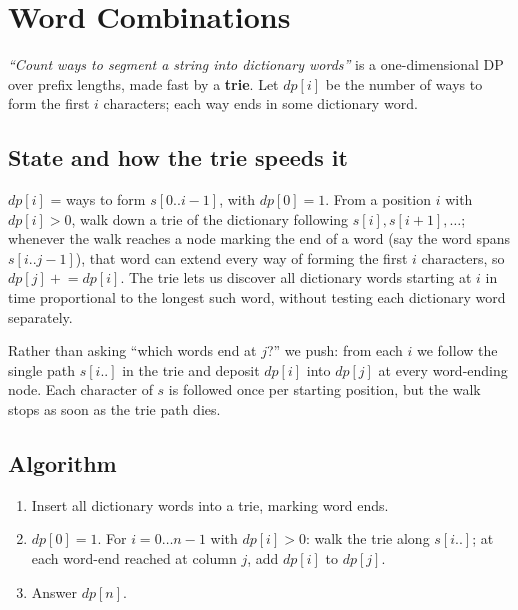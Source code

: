 \section{Word Combinations}
\label{sec:cses-word-combinations}


\begin{patternbox}
\emph{``Count ways to segment a string into dictionary words''} is a
one-dimensional DP over prefix lengths, made fast by a \textbf{trie}. Let
$\textit{dp}[i]$ be the number of ways to form the first $i$ characters;
each way ends in some dictionary word.
\end{patternbox}

\subsection*{State and how the trie speeds it}

$\textit{dp}[i]$ = ways to form $s[0..i-1]$, with $\textit{dp}[0]=1$. From
a position $i$ with $\textit{dp}[i]>0$, walk down a trie of the dictionary
following $s[i],s[i+1],\ldots$; whenever the walk reaches a node marking
the end of a word (say the word spans $s[i..j-1]$), that word can extend
every way of forming the first $i$ characters, so
$\textit{dp}[j]\mathrel{+}=\textit{dp}[i]$. The trie lets us discover all
dictionary words starting at $i$ in time proportional to the longest such
word, without testing each dictionary word separately.

\begin{ideabox}
Rather than asking ``which words end at $j$?'' we push: from each $i$ we
follow the single path $s[i..]$ in the trie and deposit $\textit{dp}[i]$
into $\textit{dp}[j]$ at every word-ending node. Each character of $s$ is
followed once per starting position, but the walk stops as soon as the
trie path dies.
\end{ideabox}

\subsection*{Algorithm}

\begin{enumerate}
  \item Insert all dictionary words into a trie, marking word ends.
  \item $\textit{dp}[0]=1$. For $i=0\ldots n-1$ with $\textit{dp}[i]>0$:
        walk the trie along $s[i..]$; at each word-end reached at column
        $j$, add $\textit{dp}[i]$ to $\textit{dp}[j]$.
  \item Answer $\textit{dp}[n]$.
\end{enumerate}

